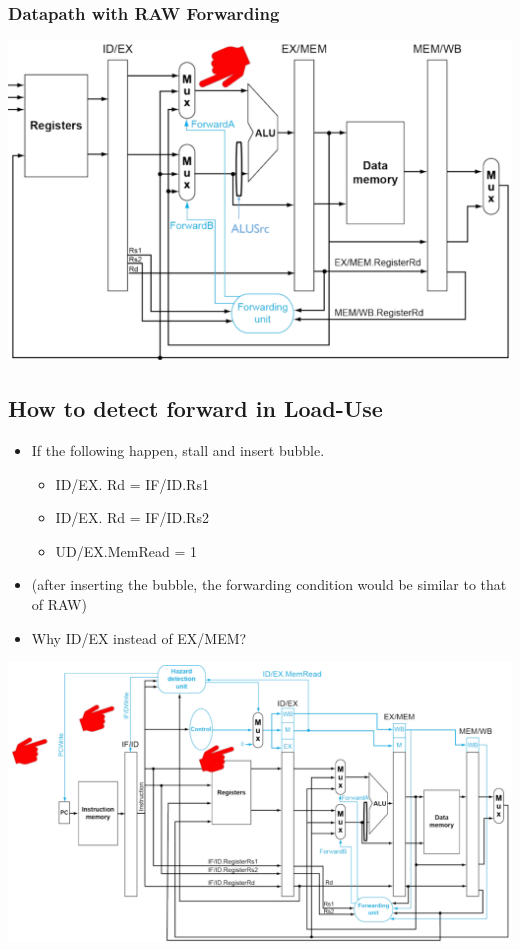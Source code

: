 \documentclass[10pt]{article}
\begin{document}
\subsubsection*{Datapath with RAW Forwarding}
\begin{center}
    \includegraphics*[scale=0.6]{W3_14.png}
\end{center}

\subsection*{How to detect forward in Load-Use}
\begin{itemize}
    \item If the following happen, stall and insert bubble.
    \begin{itemize}
        \item ID/EX. Rd = IF/ID.Rs1
        \item ID/EX. Rd = IF/ID.Rs2
        \item UD/EX.MemRead = 1
    \end{itemize}
    \item (after inserting the bubble, the forwarding condition would be similar to that of RAW)
    \item Why ID/EX instead of EX/MEM?
\end{itemize}
\begin{center}
    \includegraphics*[scale=0.55]{W3_15.png}
\end{center}
\end{document}

